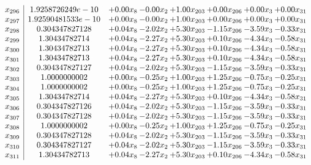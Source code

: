\documentclass[8pt]{article}
\begin{document}
\[\begin{array}{c| c c@{\hskip 2pt} c@{\hskip 2pt} c@{\hskip 2pt} c@{\hskip 2pt} c@{\hskip 2pt} c@{\hskip 2pt} }
 x_{296}   &  1.9258726249e-10 & +  0.00 x_{8} & -0.00 x_{2} & +  1.00 x_{203} & +  0.00 x_{206} & +  0.00 x_{3} & +  0.00 x_{31}\\
 x_{297}   &  1.92590481533e-10 & +  0.00 x_{8} & -0.00 x_{2} & +  1.00 x_{203} & +  0.00 x_{206} & +  0.00 x_{3} & +  0.00 x_{31}\\
 x_{298}   &  0.304347827128 & +  0.04 x_{8} & -2.02 x_{2} & +  5.30 x_{203} & -1.15 x_{206} & -3.59 x_{3} & -0.33 x_{31}\\
 x_{299}   &  1.30434782714 & +  0.04 x_{8} & -2.27 x_{2} & +  5.30 x_{203} & +  0.10 x_{206} & -4.34 x_{3} & -0.58 x_{31}\\
 x_{300}   &  1.30434782713 & +  0.04 x_{8} & -2.27 x_{2} & +  5.30 x_{203} & +  0.10 x_{206} & -4.34 x_{3} & -0.58 x_{31}\\
 x_{301}   &  1.30434782713 & +  0.04 x_{8} & -2.27 x_{2} & +  5.30 x_{203} & +  0.10 x_{206} & -4.34 x_{3} & -0.58 x_{31}\\
 x_{302}   &  0.304347827127 & +  0.04 x_{8} & -2.02 x_{2} & +  5.30 x_{203} & -1.15 x_{206} & -3.59 x_{3} & -0.33 x_{31}\\
 x_{303}   &  1.0000000002 & +  0.00 x_{8} & -0.25 x_{2} & +  1.00 x_{203} & +  1.25 x_{206} & -0.75 x_{3} & -0.25 x_{31}\\
 x_{304}   &  1.0000000002 & +  0.00 x_{8} & -0.25 x_{2} & +  1.00 x_{203} & +  1.25 x_{206} & -0.75 x_{3} & -0.25 x_{31}\\
 x_{305}   &  1.30434782714 & +  0.04 x_{8} & -2.27 x_{2} & +  5.30 x_{203} & +  0.10 x_{206} & -4.34 x_{3} & -0.58 x_{31}\\
 x_{306}   &  0.304347827126 & +  0.04 x_{8} & -2.02 x_{2} & +  5.30 x_{203} & -1.15 x_{206} & -3.59 x_{3} & -0.33 x_{31}\\
 x_{307}   &  0.304347827128 & +  0.04 x_{8} & -2.02 x_{2} & +  5.30 x_{203} & -1.15 x_{206} & -3.59 x_{3} & -0.33 x_{31}\\
 x_{308}   &  1.0000000002 & +  0.00 x_{8} & -0.25 x_{2} & +  1.00 x_{203} & +  1.25 x_{206} & -0.75 x_{3} & -0.25 x_{31}\\
 x_{309}   &  0.304347827128 & +  0.04 x_{8} & -2.02 x_{2} & +  5.30 x_{203} & -1.15 x_{206} & -3.59 x_{3} & -0.33 x_{31}\\
 x_{310}   &  0.304347827127 & +  0.04 x_{8} & -2.02 x_{2} & +  5.30 x_{203} & -1.15 x_{206} & -3.59 x_{3} & -0.33 x_{31}\\
 x_{311}   &  1.30434782713 & +  0.04 x_{8} & -2.27 x_{2} & +  5.30 x_{203} & +  0.10 x_{206} & -4.34 x_{3} & -0.58 x_{31}\\

\end{array}\]
\end{document}
